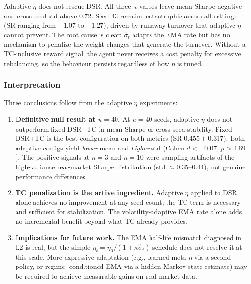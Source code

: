 \documentclass[conference]{IEEEtran}
\begin{document}
Adaptive $\eta$ does not rescue DSR. All three $\kappa$ values leave
mean Sharpe negative and cross-seed std above 0.72. Seed 43 remains
catastrophic across all settings (SR ranging from $-$1.07 to $-$1.27),
driven by runaway turnover that adaptive $\eta$ cannot prevent. The
root cause is clear: $\hat{\sigma}_t$ adapts the EMA rate but has no
mechanism to penalize the weight changes that generate the turnover.
Without a TC-inclusive reward signal, the agent never receives a
cost penalty for excessive rebalancing, so the behaviour persists
regardless of how $\eta$ is tuned.

\subsubsection{Interpretation}

Three conclusions follow from the adaptive $\eta$ experiments:

\begin{enumerate}
    \item \textbf{Definitive null result at $n=40$.}
    At $n=40$ seeds, adaptive $\eta$ does not outperform fixed
    DSR+TC in mean Sharpe or cross-seed stability.
    Fixed DSR+TC is the best configuration on both metrics
    (SR $0.455 \pm 0.317$). Both adaptive configs yield
    \emph{lower} mean and \emph{higher} std (Cohen $d < -0.07$,
    $p > 0.69$). The positive signals at $n=3$ and $n=10$
    were sampling artifacts of the high-variance real-market
    Sharpe distribution (std $\approx 0.35$--$0.44$), not
    genuine performance differences.

    \item \textbf{TC penalization is the active ingredient.}
    Adaptive $\eta$ applied to DSR alone achieves no improvement
    at any seed count; the TC term is necessary and sufficient
    for stabilization. The volatility-adaptive EMA rate
    alone adds no incremental benefit beyond what TC already provides.

    \item \textbf{Implications for future work.}
    The EMA half-life mismatch diagnosed in L2 is real, but the
    simple $\eta_t = \eta_0/(1+\kappa\hat{\sigma}_t)$ schedule
    does not resolve it at this scale. More expressive adaptation
    (e.g., learned meta-$\eta$ via a second policy, or regime-
    conditioned EMA via a hidden Markov state estimate) may be
    required to achieve measurable gains on real-market data.
\end{enumerate}
\end{document}
